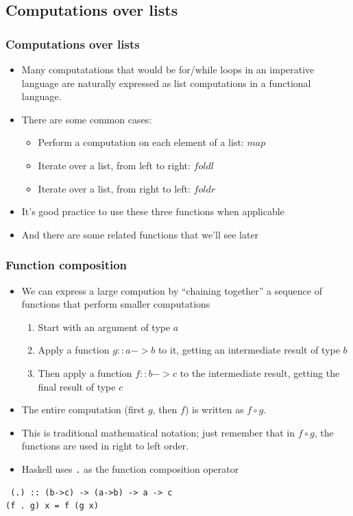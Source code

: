 \documentclass{beamer}
\begin{document}
\subsection{Computations over lists}
\begin{frame}[fragile]
\frametitle{Computations over lists}

\begin{itemize}
\item Many computatations that would be for/while loops in an
  imperative language are naturally expressed as list computations
  in a functional language.
\item There are some common cases:
  \begin{itemize}
  \item Perform a computation on each element of a list: $map$
  \item Iterate over a list, from left to right: $foldl$
  \item Iterate over a list, from right to left: $foldr$
  \end{itemize}
\item It's good practice to use these three functions when
  applicable
\item And there are some related functions that we'll see later
\end{itemize}

\end{frame}

\begin{frame}[fragile]
\frametitle{Function composition}

\begin{itemize}
\item We can express a large compution by ``chaining together'' a
  sequence of functions that perform smaller computations
  \begin{enumerate}
  \item Start with an argument of type $a$
  \item Apply a function $g :: a->b$ to it, getting an intermediate
    result of type $b$
  \item Then apply a function  $f :: b->c$ to the intermediate
    result, getting the final result of type $c$
  \end{enumerate}
\item The entire computation (first $g$, then $f$) is written as $f
  \circ g$.
\item This is traditional mathematical notation; just remember that
  in $f \circ g$, the functions are used in right to left order.
  \item Haskell uses \texttt{.} as the function composition operator
\end{itemize}

\begin{verbatim}
 (.) :: (b->c) -> (a->b) -> a -> c
(f . g) x = f (g x)
\end{verbatim}

\end{frame}
\end{document}

